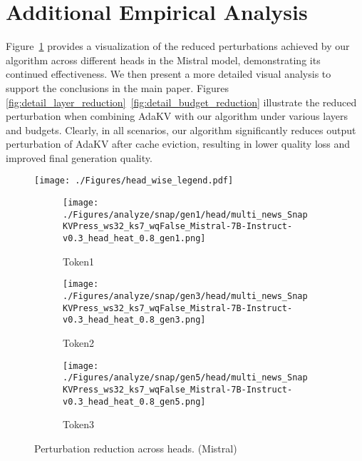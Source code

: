 \section{Additional Empirical Analysis}
\label{apdx:detail_analysis}
Figure~\ref{fig:head_wise_mistral} provides a visualization of the reduced perturbations achieved by our algorithm across different heads in the Mistral model, demonstrating its continued effectiveness.
We then present a more detailed visual analysis to support the conclusions in the main paper. Figures \ref{fig:detail_layer_reduction}~\ref{fig:detail_budget_reduction} illustrate the reduced perturbation when combining AdaKV with our algorithm under various layers and budgets. Clearly, in all scenarios, our algorithm significantly reduces output perturbation of AdaKV after cache eviction, resulting in lower quality loss and improved final generation quality.

\begin{figure}[t]
	\centering
	\texttt{[image: ./Figures/head\_wise\_legend.pdf]}
	\begin{subfigure}[b]{0.25\linewidth}
		\texttt{[image: ./Figures/analyze/snap/gen1/head/multi\_news\_SnapKVPress\_ws32\_ks7\_wqFalse\_Mistral-7B-Instruct-v0.3\_head\_heat\_0.8\_gen1.png]}
		\vspace{-0.5cm}
		\caption{Token1 }
	\end{subfigure}
	\begin{subfigure}[b]{0.25\linewidth}		\texttt{[image: ./Figures/analyze/snap/gen3/head/multi\_news\_SnapKVPress\_ws32\_ks7\_wqFalse\_Mistral-7B-Instruct-v0.3\_head\_heat\_0.8\_gen3.png]}
		\vspace{-0.5cm}
		\caption{Token2 }
	\end{subfigure}
	\begin{subfigure}[b]{0.25\linewidth}
		\texttt{[image: ./Figures/analyze/snap/gen5/head/multi\_news\_SnapKVPress\_ws32\_ks7\_wqFalse\_Mistral-7B-Instruct-v0.3\_head\_heat\_0.8\_gen5.png]}
		\vspace{-0.5cm}
		\caption{Token3 }
	\end{subfigure}
	\caption{ Perturbation reduction across heads. (Mistral)} 
	\label{fig:head_wise_mistral}
	

\end{figure}


